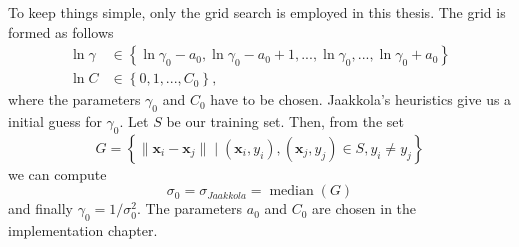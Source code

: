 To keep things simple, only the grid search is employed in this thesis. The grid is formed as follows
\begin{align}
\ln{\gamma} &\in \left \{ \ln{\gamma_0} - a_0, \ln{\gamma_0} - a_0 + 1, ..., \ln{\gamma_0}, ..., \ln{\gamma_0} + a_0 \right \} \label{eq:svm_gamma} \\
\ln{C} &\in \left \{ 0, 1, ..., C_0 \right \}, \label{eq:svm_c}
\end{align}
where the parameters $\gamma_0$ and $C_0$ have to be chosen. Jaakkola's heuristics \cite{Jaakkola99} give us a initial guess for $\gamma_0$. Let $S$ be our training set. Then, from the set
\begin{equation}
G = \left \{ \lVert \mathbf{x}_i - \mathbf{x}_j \rVert \; | \; (\mathbf{x}_i, y_i), (\mathbf{x}_j, y_j) \in S, y_i \ne y_j \right \}
\end{equation}
we can compute
\begin{equation}
\sigma_0 = \sigma_{Jaakkola} = \operatorname{median}(G)
\end{equation}
and finally $\gamma_0 = 1 / \sigma_0^2$. The parameters $a_0$ and $C_0$ are chosen in the implementation chapter.



